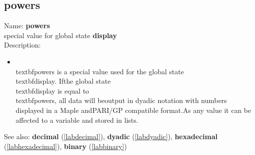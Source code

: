 \subsection{powers}
\label{labpowers}
\noindent Name: \textbf{powers}\\
special value for global state \textbf{display}\\
\noindent Description: \begin{itemize}

\item \\textbf{powers} is a special value used for the global state \\textbf{display}.  If\n   the global state \\textbf{display} is equal to \\textbf{powers}, all data will be\n   output in dyadic notation with numbers displayed in a Maple and\n   PARI/GP compatible format.\n    \n   As any value it can be affected to a variable and stored in lists.\n\end{itemize}
See also: \textbf{decimal} (\ref{labdecimal}), \textbf{dyadic} (\ref{labdyadic}), \textbf{hexadecimal} (\ref{labhexadecimal}), \textbf{binary} (\ref{labbinary})
